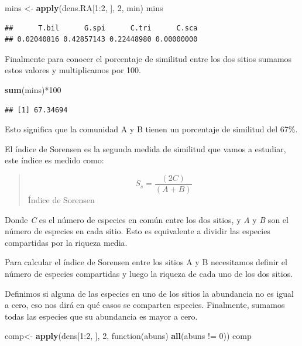 \documentclass[]{book}
\newenvironment{Shaded}{\begin{snugshade}}{\end{snugshade}}
\newcommand{\KeywordTok}[1]{\textcolor[rgb]{0.13,0.29,0.53}{\textbf{{#1}}}}
\newcommand{\DecValTok}[1]{\textcolor[rgb]{0.00,0.00,0.81}{{#1}}}
\newcommand{\StringTok}[1]{\textcolor[rgb]{0.31,0.60,0.02}{{#1}}}
\newcommand{\NormalTok}[1]{{#1}}
\begin{document}
\begin{Shaded}
\begin{Highlighting}[]
\NormalTok{mins <-}\StringTok{ }\KeywordTok{apply}\NormalTok{(dens.RA[}\DecValTok{1}\NormalTok{:}\DecValTok{2}\NormalTok{, ], }\DecValTok{2}\NormalTok{, min)}
\NormalTok{mins}
\end{Highlighting}
\end{Shaded}

\begin{verbatim}
##      T.bil      G.spi      C.tri      C.sca 
## 0.02040816 0.42857143 0.22448980 0.00000000
\end{verbatim}

Finalmente para conocer el porcentaje de similitud entre los dos sitios
sumamos estos valores y multiplicamos por 100.

\begin{Shaded}
\begin{Highlighting}[]
\KeywordTok{sum}\NormalTok{(mins)*}\DecValTok{100}
\end{Highlighting}
\end{Shaded}

\begin{verbatim}
## [1] 67.34694
\end{verbatim}

Esto significa que la comunidad A y B tienen un porcentaje de similitud
del 67\%.

El índice de Sorensen es la segunda medida de similitud que vamos a
estudiar, este índice es medido como:

\begin{quote}
\[S_s= \frac{(2C)}{(A+B)}\] Índice de Sorensen
\end{quote}

Donde \emph{C} es el número de especies en común entre los dos sitios, y
\emph{A} y \emph{B} son el número de especies en cada sitio. Esto es
equivalente a dividir las especies compartidas por la riqueza media.

Para calcular el índice de Sorensen entre los sitios A y B necesitamos
definir el número de especies compartidas y luego la riqueza de cada uno
de los dos sitios.

Definimos si alguna de las especies en uno de los sitios la abundancia
no es igual a cero, eso nos dirá en qué casos se comparten especies.
Finalmente, sumamos todas las especies que su abundancia es mayor a
cero.

\begin{Shaded}
\begin{Highlighting}[]
\NormalTok{comp<-}\StringTok{ }\KeywordTok{apply}\NormalTok{(dens[}\DecValTok{1}\NormalTok{:}\DecValTok{2}\NormalTok{, ], }\DecValTok{2}\NormalTok{, function(abuns) }\KeywordTok{all}\NormalTok{(abuns !=}\StringTok{ }\DecValTok{0}\NormalTok{))}
\NormalTok{comp}
\end{Highlighting}
\end{Shaded}
\end{document}
